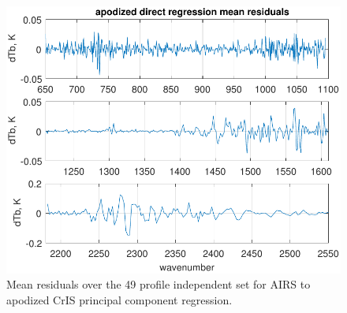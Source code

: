 \documentclass[journal]{IEEEtran}
\begin{document}

\begin{figure} %
  \centering
  \includegraphics[width=\linewidth]{figures/ap_pc_regr.pdf}
  \caption{Mean residuals over the 49 profile independent set for
    AIRS to apodized CrIS principal component regression.}
  \label{dreg6}
\end{figure}
\end{document}

